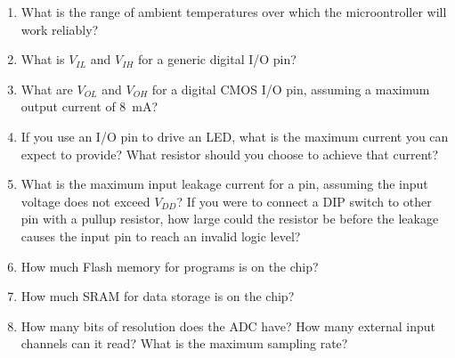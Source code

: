\documentclass{e85}
\begin{document}
\begin{enumerate}
\begin{enumerate}
  \item What is the range of ambient temperatures over which the
    microontroller will work reliably?

    \begin{solution}
    \end{solution}

  \item What is \(V_{IL}\) and \(V_{IH}\) for a generic digital I/O
    pin?

    \begin{solution}
    \end{solution}

  \item What are \(V_{OL}\) and \(V_{OH}\) for a digital CMOS I/O pin,
    assuming a maximum output current of \SI{8}{\mA}?

    \begin{solution}
    \end{solution}

  \item If you use an I/O pin to drive an LED, what is the maximum
    current you can expect to provide?  What resistor should you
    choose to achieve that current?

    \begin{solution}
    \end{solution}

  \item What is the maximum input leakage current for a pin, assuming
    the input voltage does not exceed \(V_{DD}\)?  If you were to
    connect a DIP switch to other pin with a pullup resistor, how
    large could the resistor be before the leakage causes the input
    pin to reach an invalid logic level?

    \begin{solution}
    \end{solution}

  \item How much Flash memory for programs is on the chip?

    \begin{solution}
    \end{solution}

  \item How much SRAM for data storage is on the chip?

    \begin{solution}
    \end{solution}

  \item How many bits of resolution does the ADC have?  How many
    external input channels can it read?  What is the maximum sampling
    rate?


\end{enumerate}
\end{enumerate}
\end{document}
